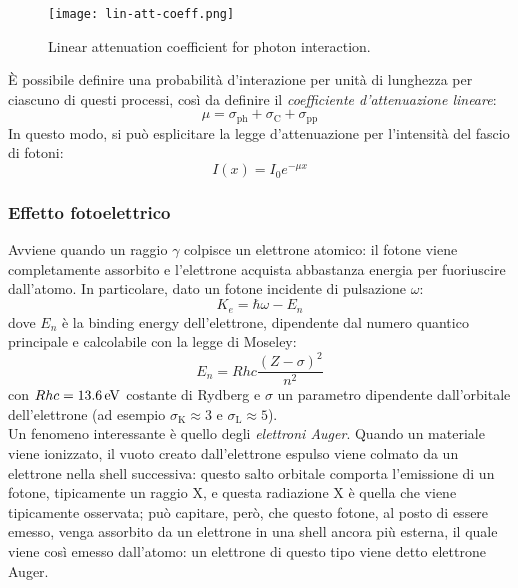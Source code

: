 \begin{figure}[!b]
	\centering
	\texttt{[image: lin-att-coeff.png]}
	\caption{Linear attenuation coefficient for photon interaction.}
	\label{ph-i-p}
\end{figure}

È possibile definire una probabilità d'interazione per unità di lunghezza per ciascuno di questi processi, così da definire il \textit{coefficiente d'attenuazione lineare}:
\begin{equation}
	\mu = \sigma_{\text{ph}} + \sigma_{\text{C}} + \sigma_{\text{pp}}
	\label{eq:3.7}
\end{equation}
In questo modo, si può esplicitare la legge d'attenuazione per l'intensità del fascio di fotoni:
\begin{equation}
	I(x) = I_0 e^{-\mu x}
	\label{eq:3.8}
\end{equation}

\subsubsection{Effetto fotoelettrico}

Avviene quando un raggio $ \gamma $ colpisce un elettrone atomico: il fotone viene completamente assorbito e l'elettrone acquista abbastanza energia per fuoriuscire dall'atomo. In particolare, dato un fotone incidente di pulsazione $ \omega $:
\begin{equation}
	K_e = \hbar \omega - E_n
	\label{eq:3.9}
\end{equation}
dove $ E_n $ è la binding energy dell'elettrone, dipendente dal numero quantico principale e calcolabile con la legge di Moseley:
\begin{equation}
	E_n = Rhc \frac{(Z - \sigma)^2}{n^2}
	\label{eq:3.10}
\end{equation}
con $ Rhc = 13.6 \,\mathrm{eV} $ costante di Rydberg e $ \sigma $ un parametro dipendente dall'orbitale dell'elettrone (ad esempio $ \sigma_{\text{K}} \approx 3 $ e $ \sigma_{\text{L}} \approx 5 $).\\
Un fenomeno interessante è quello degli \textit{elettroni Auger}. Quando un materiale viene ionizzato, il vuoto creato dall'elettrone espulso viene colmato da un elettrone nella shell successiva: questo salto orbitale comporta l'emissione di un fotone, tipicamente un raggio X, e questa radiazione X è quella che viene tipicamente osservata; può capitare, però, che questo fotone, al posto di essere emesso, venga assorbito da un elettrone in una shell ancora più esterna, il quale viene così emesso dall'atomo: un elettrone di questo tipo viene detto elettrone Auger.

